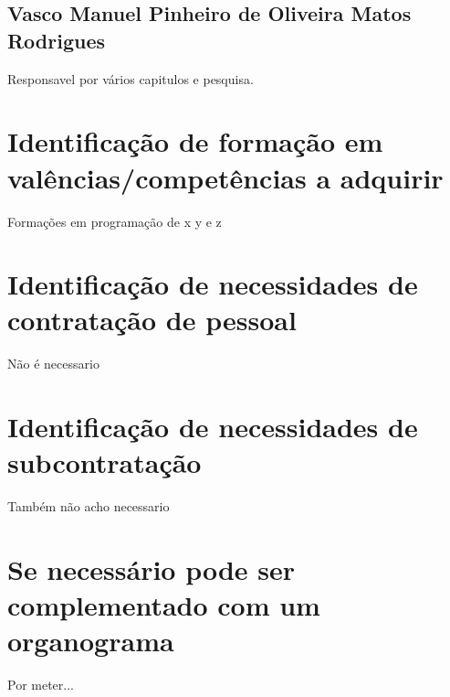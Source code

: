 \subsection{Vasco Manuel Pinheiro de Oliveira Matos Rodrigues}
Responsavel por vários capitulos e pesquisa.
\section{Identificação de formação em valências/competências a adquirir}
Formações em programação de x y e z
\section{Identificação de necessidades de contratação de pessoal}
Não é necessario
\section{Identificação de necessidades de subcontratação}
Também não acho necessario
\section{Se necessário pode ser complementado com um organograma}
Por meter... 